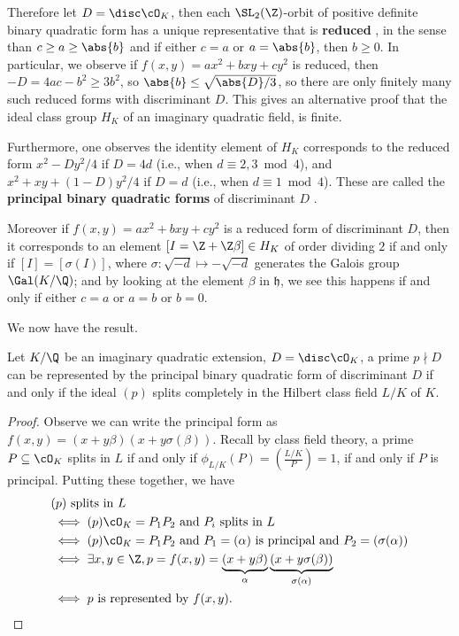 \documentclass[11pt]{amsart}
\begin{document}
Therefore let $D = \disc \cO_K$, then each $\SL_2(\Z)$-orbit of positive
definite binary quadratic form has a unique representative that is {\bf reduced}
, in the sense than $c \geq a \geq \abs{b}$ and if either $c
= a$ or $a = \abs{b}$, then $b \geq 0$.  In particular, we observe if $f(x,y) =
ax^2 + bxy + cy^2$ is reduced, then $-D = 4ac - b^2 \geq 3 b^2$, so $\abs{b}
\leq \sqrt{\abs{D}/3}$, so there are only finitely many such reduced forms with
discriminant $D$.  This gives an alternative proof that the ideal class group
$H_K$ of an imaginary quadratic field, is finite.

\medskip

Furthermore, one observes the identity element of $H_K$ corresponds to the
reduced form $x^2 - Dy^2/4$ if $D = 4d$ (i.e., when $d \equiv 2,3 \bmod{4}$),
and $x^2 + xy + (1 - D)y^2/4$ if $D = d$ (i.e., when $d \equiv 1 \bmod{4}$).
These are called the {\bf principal binary quadratic forms} of discriminant $D$
.

Moreover if $f(x,y) = ax^2 + bxy + cy^2$ is a reduced form of discriminant $D$,
then it corresponds to an element $[I = \Z + \Z \beta] \in H_K$ of order
dividing $2$ if and only if $[I] = [\sigma(I)]$, where $\sigma : \sqrt{-d}
\mapsto -\sqrt{-d}$ generates the Galois group $\Gal(K/\Q)$; and by looking at
the element $\beta$ in $ \mathfrak{h} $, we see this happens if and only if
either $c = a$ or $a = b$ or $b = 0$.

\medskip

We now have the result.

\begin{cor}
    Let $K/\Q$ be an imaginary quadratic extension, $D = \disc \cO_K$, a prime
    $p \nmid D$ can be represented by the principal binary quadratic form of
    discriminant $D$ if and only if the ideal $(p)$ splits completely in the
    Hilbert class field $L/K$ of $K$.
\end{cor}

\begin{proof}
    Observe we can write the principal form as $f(x,y) = (x + y\beta)(x +
    y\sigma(\beta))$.  Recall by class field theory, a prime $P \subseteq \cO_K$
    splits in $L$ if and only if $\phi_{L/K}(P) = \genfrac(){}{}{L/K}{P} = 1$,
    if and only if $P$ is principal.  Putting these together, we have
    \begin{align*}
        & (p) \text{ splits in } L\\
        & \iff (p)\cO_K = P_1 P_2 \text{ and } P_i \text{ splits in } L\\
        & \iff (p)\cO_K = P_1 P_2 \text{ and } P_1 = (\alpha) \text{ is
            principal and } P_2 = (\sigma(\alpha))\\
        & \iff \exists x,y \in \Z, p = f(x,y) = \underbrace{(x + y\beta)}_{\alpha}
        \underbrace{(x + y \sigma(\beta))}_{\sigma(\alpha)}\\
        & \iff p \text{ is represented by } f(x,y).
    \end{align*}
\end{proof}





\printindex



\end{document}
